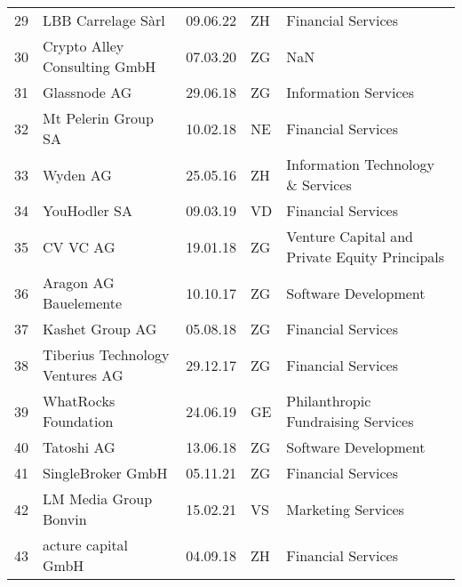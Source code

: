 \begin{tabular}{lllll}
29  &                                 LBB Carrelage Sàrl &      09.06.22 &     ZH &                             Financial Services \\
30  &                       Crypto Alley Consulting GmbH &      07.03.20 &     ZG &                                            NaN \\
31  &                                       Glassnode AG &      29.06.18 &     ZG &                           Information Services \\
32  &                                Mt Pelerin Group SA &      10.02.18 &     NE &                             Financial Services \\
33  &                                           Wyden AG &      25.05.16 &     ZH &              Information Technology \& Services \\
34  &                                       YouHodler SA &      09.03.19 &     VD &                             Financial Services \\
35  &                                           CV VC AG &      19.01.18 &     ZG &  Venture Capital and Private Equity Principals \\
36  &                              Aragon AG Bauelemente &      10.10.17 &     ZG &                           Software Development \\
37  &                                    Kashet Group AG &      05.08.18 &     ZG &                             Financial Services \\
38  &                    Tiberius Technology Ventures AG &      29.12.17 &     ZG &                             Financial Services \\
39  &                               WhatRocks Foundation &      24.06.19 &     GE &             Philanthropic Fundraising Services \\
40  &                                         Tatoshi AG &      13.06.18 &     ZG &                           Software Development \\
41  &                                  SingleBroker GmbH &      05.11.21 &     ZG &                             Financial Services \\
42  &                              LM Media Group Bonvin &      15.02.21 &     VS &                             Marketing Services \\
43  &                                acture capital GmbH &      04.09.18 &     ZH &                             Financial Services \\

\end{tabular}
